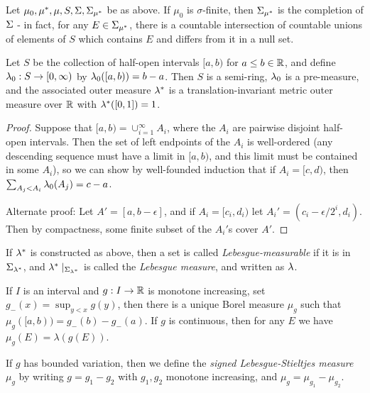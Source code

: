 \begin{prop} Let $\mu_0, \mu^*, \mu, S, \Sigma, \Sigma_{\mu^*}$ be as above. If $\mu_0$ is $\sigma$-finite, then $\Sigma_{\mu^*}$ is the completion of $\Sigma$ - in fact, for any $E \in \Sigma_{\mu^*}$, there is a countable intersection of countable unions of elements of $S$ which contains $E$ and differs from it in a null set.
\end{prop}

\begin{thm} Let $S$ be the collection of half-open intervals $[a,b)$ for $a \le b \in \mathbb{R}$, and define $\lambda_0 : S \rightarrow [0,\infty)$ by $\lambda_0([a,b)) = b-a$. Then $S$ is a semi-ring, $\lambda_0$ is a pre-measure, and the associated outer measure $\lambda^*$ is a translation-invariant metric outer measure over $\mathbb{R}$ with $\lambda^*([0,1]) = 1$.
\end{thm}
\begin{proof} Suppose that $[a,b) = \cup_{i=1}^\infty A_i$, where the $A_i$ are pairwise disjoint half-open intervals. Then the set of left endpoints of the $A_i$ is well-ordered (any descending sequence must have a limit in $[a,b)$, and this limit must be contained in some $A_i$), so we can show by well-founded induction that if $A_i = [c,d)$, then $\sum_{A_j < A_i} \lambda_0(A_j) = c-a$.

Alternate proof: Let $A' = [a,b-\epsilon]$, and if $A_i = [c_i,d_i)$ let $A_i' = (c_i - \epsilon/2^i, d_i)$. Then by compactness, some finite subset of the $A_i'$s cover $A'$.
\end{proof}

\begin{defn} If $\lambda^*$ is constructed as above, then a set is called \emph{Lebesgue-measurable} if it is in $\Sigma_{\lambda^*}$, and $\lambda^*\mid_{\Sigma_{\lambda^*}}$ is called the \emph{Lebesgue measure}, and written as $\lambda$.
\end{defn}

\begin{thm}\label{lebesgue-stieltjes} If $I$ is an interval and $g: I \rightarrow \mathbb{R}$ is monotone increasing, set $g_-(x) = \sup_{y < x} g(y)$, then there is a unique Borel measure $\mu_g$ such that $\mu_g([a,b)) = g_-(b) - g_-(a)$. If $g$ is continuous, then for any $E$ we have $\mu_g(E) = \lambda(g(E))$.
\end{thm}

\begin{defn} If $g$ has bounded variation, then we define the \emph{signed Lebesgue-Stieltjes measure} $\mu_g$ by writing $g = g_1 - g_2$ with $g_1, g_2$ monotone increasing, and $\mu_g = \mu_{g_1} - \mu_{g_2}$.
\end{defn}

